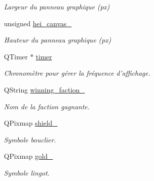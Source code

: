 \begin{DoxyCompactItemize}
\begin{DoxyCompactList}\small\item\em Largeur du panneau graphique (px) \end{DoxyCompactList}\item 
\hypertarget{classDisplayer_ae7d9e96ca745d502672369fc4d1cde5c}{unsigned \hyperlink{classDisplayer_ae7d9e96ca745d502672369fc4d1cde5c}{hei\-\_\-canvas\-\_\-}}\label{classDisplayer_ae7d9e96ca745d502672369fc4d1cde5c}

\begin{DoxyCompactList}\small\item\em Hauteur du panneau graphique (px) \end{DoxyCompactList}\item 
\hypertarget{classDisplayer_a9edd62c6f4cf550385c1dc9933e49d0e}{Q\-Timer $\ast$ \hyperlink{classDisplayer_a9edd62c6f4cf550385c1dc9933e49d0e}{timer}}\label{classDisplayer_a9edd62c6f4cf550385c1dc9933e49d0e}

\begin{DoxyCompactList}\small\item\em Chronomètre pour gérer la fréquence d'affichage. \end{DoxyCompactList}\item 
\hypertarget{classDisplayer_a77b8f1b3b40fd64c89e54f12e7b5a0df}{Q\-String \hyperlink{classDisplayer_a77b8f1b3b40fd64c89e54f12e7b5a0df}{winning\-\_\-faction\-\_\-}}\label{classDisplayer_a77b8f1b3b40fd64c89e54f12e7b5a0df}

\begin{DoxyCompactList}\small\item\em Nom de la faction gagnante. \end{DoxyCompactList}\item 
\hypertarget{classDisplayer_a79d7176c3335586cca68709aedcf064b}{Q\-Pixmap \hyperlink{classDisplayer_a79d7176c3335586cca68709aedcf064b}{shield\-\_\-}}\label{classDisplayer_a79d7176c3335586cca68709aedcf064b}

\begin{DoxyCompactList}\small\item\em Symbole bouclier. \end{DoxyCompactList}\item 
\hypertarget{classDisplayer_a90406aeaba7f4c87910305f2592743fb}{Q\-Pixmap \hyperlink{classDisplayer_a90406aeaba7f4c87910305f2592743fb}{gold\-\_\-}}\label{classDisplayer_a90406aeaba7f4c87910305f2592743fb}

\begin{DoxyCompactList}\small\item\em Symbole lingot. \end{DoxyCompactList}\end{DoxyCompactItemize}


